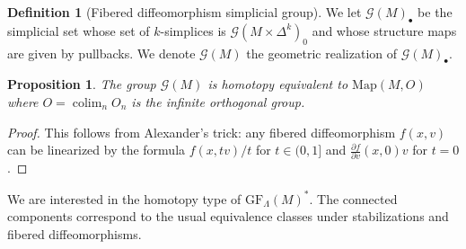 \documentclass[12pt,a4paper]{article}
\numberwithin{equation}{section}
\newtheorem{prop}[equation]{Proposition}
\theoremstyle{definition}
\newtheorem{dfn}[equation]{Definition}
\theoremstyle{remark}
\newcommand{\Map}{\mathrm{Map}}
\newcommand{\del}{\partial}
\newcommand{\G}{\mathcal{G}}
\DeclareMathOperator{\colim}{colim}
\newcommand{\GF}{\mathrm{GF}}
\begin{document}
\begin{dfn}[Fibered diffeomorphism simplicial group]
We let $\G(M)_\bullet$ be the simplicial set whose set of $k$-simplices is $\G(M\times \Delta^k)_0$
and whose structure maps are given by pullbacks. We denote $\G(M)$ the geometric realization of $\G(M)_\bullet$.
\end{dfn}

\begin{prop}
The group $\G(M)$ is homotopy equivalent to $\Map(M,O)$ where $O=\colim_n O_n$ is the infinite orthogonal group.
\end{prop}
\begin{proof}
This follows from Alexander's trick: any fibered diffeomorphism $f(x,v)$ can be linearized by the formula $f(x,tv)/t$ for $t\in(0,1]$
and $\frac{\del f}{\del v}(x,0) v$ for $t=0$.
\end{proof}

We are interested in the homotopy type of $\GF_\Lambda(M)^*$. The connected components correspond
to the usual equivalence classes under stabilizations and fibered diffeomorphisms.
\end{document}
